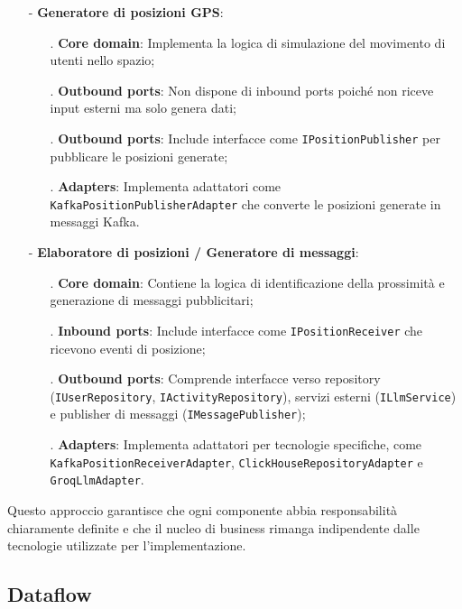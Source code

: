 \documentclass[10pt]{article}
\begin{document}
    \begin{itemize}
        \item[-] \textbf{Generatore di posizioni GPS}:
        \begin{itemize}
            \item[.] \textbf{Core domain}: Implementa la logica di simulazione del movimento di utenti nello spazio;
            \item[.] \textbf{Outbound ports}: Non dispone di inbound ports poiché non riceve input esterni ma solo genera dati;
            \item[.] \textbf{Outbound ports}: Include interfacce come \texttt{IPositionPublisher} per pubblicare le posizioni generate;
            \item[.] \textbf{Adapters}: Implementa adattatori come \texttt{KafkaPositionPublisherAdapter} che converte le posizioni generate in messaggi Kafka.
        \end{itemize}
        
        \item[-] \textbf{Elaboratore di posizioni / Generatore di messaggi}:
        \begin{itemize}
            \item[.] \textbf{Core domain}: Contiene la logica di identificazione della prossimità e generazione di messaggi pubblicitari;
            \item[.] \textbf{Inbound ports}: Include interfacce come \texttt{IPositionReceiver} che ricevono eventi di posizione;
            \item[.] \textbf{Outbound ports}: Comprende interfacce verso repository (\texttt{IUserRepository}, \texttt{IActivityRepository}), servizi esterni (\texttt{ILlmService}) e publisher di messaggi (\texttt{IMessagePublisher});
            \item[.] \textbf{Adapters}: Implementa adattatori per tecnologie specifiche, come \texttt{KafkaPositionReceiverAdapter}, \texttt{ClickHouseRepositoryAdapter} e \texttt{GroqLlmAdapter}.
        \end{itemize}
    \end{itemize}
    
    Questo approccio garantisce che ogni componente abbia responsabilità chiaramente definite e che il nucleo di business rimanga indipendente dalle tecnologie utilizzate per l'implementazione.

    \subsection{Dataflow}
    
\end{document}
